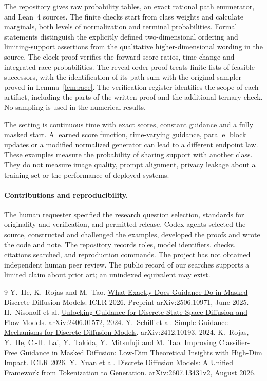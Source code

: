 \documentclass[11pt]{article}
\begin{document}
The repository gives raw probability tables, an exact rational path enumerator, and Lean~4 sources. The finite checks start from class weights and calculate marginals, both levels of normalization and terminal probabilities. Formal statements distinguish the explicitly defined two-dimensional ordering and limiting-support assertions from the qualitative higher-dimensional wording in the source. The clock proof verifies the forward-score ratios, time change and integrated race probabilities. The reveal-order proof treats finite lists of feasible successors, with the identification of its path sum with the original sampler proved in Lemma~\ref{lem:race}. The verification register identifies the scope of each artifact, including the parts of the written proof and the additional ternary check. No sampling is used in the numerical results.

The setting is continuous time with exact scores, constant guidance and a fully masked start. A learned score function, time-varying guidance, parallel block updates or a modified normalized generator can lead to a different endpoint law. These examples measure the probability of sharing support with another class. They do not measure image quality, prompt alignment, privacy leakage about a training set or the performance of deployed systems.

\paragraph{Contributions and reproducibility.}
The human requester specified the research question selection, standards for originality and verification, and permitted release. Codex agents selected the source, constructed and challenged the examples, developed the proofs and wrote the code and note. The repository records roles, model identifiers, checks, citations searched, and reproduction commands. The project has not obtained independent human peer review. The public record of our searches supports a limited claim about prior art; an unindexed equivalent may exist.

\begin{thebibliography}{9}
 Y.~He, K.~Rojas and M.~Tao.
\href{https://proceedings.iclr.cc/paper_files/paper/2026/hash/a14193e9d9fb0b03af0b717de1cac8ac-Abstract-Conference.html}{What Exactly Does Guidance Do in Masked Discrete Diffusion Models}.
ICLR 2026. Preprint \href{https://arxiv.org/abs/2506.10971}{arXiv:2506.10971}, June 2025.
 H.~Nisonoff et al.
\href{https://arxiv.org/abs/2406.01572}{Unlocking Guidance for Discrete State-Space Diffusion and Flow Models}.
arXiv:2406.01572, 2024.
 Y.~Schiff et al.
\href{https://arxiv.org/abs/2412.10193}{Simple Guidance Mechanisms for Discrete Diffusion Models}.
arXiv:2412.10193, 2024.
 K.~Rojas, Y.~He, C.-H.~Lai, Y.~Takida, Y.~Mitsufuji and M.~Tao.
\href{https://arxiv.org/abs/2507.08965}{Improving Classifier-Free Guidance in Masked Diffusion: Low-Dim Theoretical Insights with High-Dim Impact}.
ICLR 2026.
 Y.~Yuan et al.
\href{https://arxiv.org/abs/2607.13431}{Discrete Diffusion Models: A Unified Framework from Tokenization to Generation}.
arXiv:2607.13431v2, August 2026.
\end{thebibliography}
\end{document}
